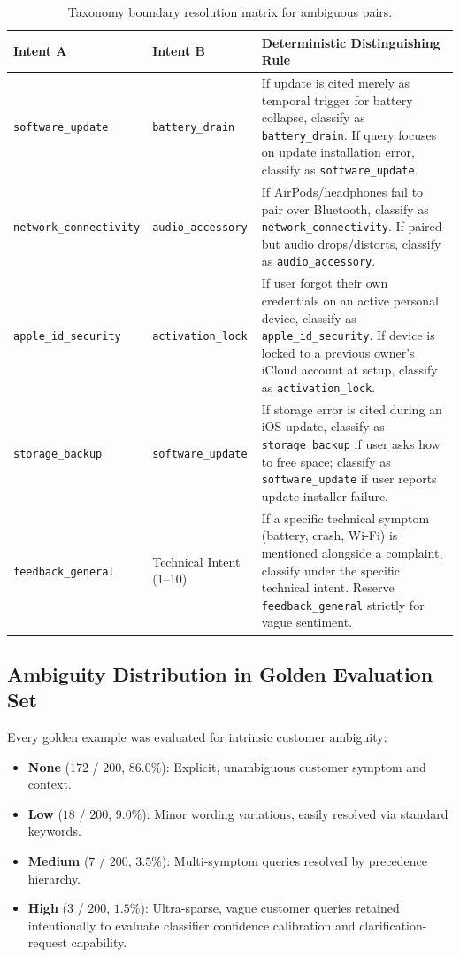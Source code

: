 \documentclass[11pt,a4paper]{article}
\begin{document}
\begin{table}[ht]
\centering
\small
\begin{tabularx}{\textwidth}{p{4.2cm}p{4.2cm}X}
\toprule
\textbf{Intent A} & \textbf{Intent B} & \textbf{Deterministic Distinguishing Rule} \\
\midrule
\texttt{software\_update} & \texttt{battery\_drain} & If update is cited merely as temporal trigger for battery collapse, classify as \texttt{battery\_drain}. If query focuses on update installation error, classify as \texttt{software\_update}. \\
\addlinespace
\texttt{network\_connectivity} & \texttt{audio\_accessory} & If AirPods/headphones fail to pair over Bluetooth, classify as \texttt{network\_connectivity}. If paired but audio drops/distorts, classify as \texttt{audio\_accessory}. \\
\addlinespace
\texttt{apple\_id\_security} & \texttt{activation\_lock} & If user forgot their own credentials on an active personal device, classify as \texttt{apple\_id\_security}. If device is locked to a previous owner's iCloud account at setup, classify as \texttt{activation\_lock}. \\
\addlinespace
\texttt{storage\_backup} & \texttt{software\_update} & If storage error is cited during an iOS update, classify as \texttt{storage\_backup} if user asks how to free space; classify as \texttt{software\_update} if user reports update installer failure. \\
\addlinespace
\texttt{feedback\_general} & Technical Intent (1--10) & If a specific technical symptom (battery, crash, Wi-Fi) is mentioned alongside a complaint, classify under the specific technical intent. Reserve \texttt{feedback\_general} strictly for vague sentiment. \\
\bottomrule
\end{tabularx}
\caption{Taxonomy boundary resolution matrix for ambiguous pairs.}
\label{tab:boundary_matrix}
\end{table}

\subsection{Ambiguity Distribution in Golden Evaluation Set}
Every golden example was evaluated for intrinsic customer ambiguity:
\begin{itemize}[leftmargin=*]
    \item \textbf{None} ($172$ / $200$, $86.0\%$): Explicit, unambiguous customer symptom and context.
    \item \textbf{Low} ($18$ / $200$, $9.0\%$): Minor wording variations, easily resolved via standard keywords.
    \item \textbf{Medium} ($7$ / $200$, $3.5\%$): Multi-symptom queries resolved by precedence hierarchy.
    \item \textbf{High} ($3$ / $200$, $1.5\%$): Ultra-sparse, vague customer queries retained intentionally to evaluate classifier confidence calibration and clarification-request capability.
\end{itemize}
\end{document}
